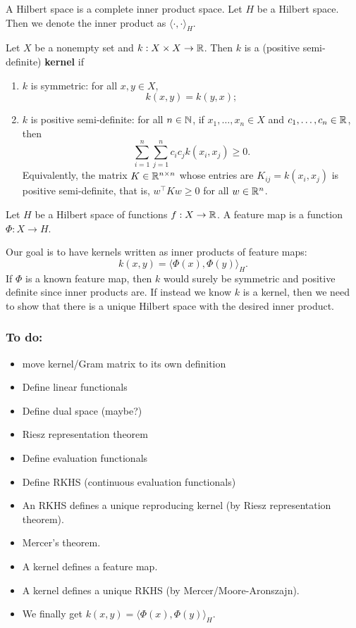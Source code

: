 \begin{definition}
    A Hilbert space is a complete inner product space.
    Let \(H\) be a Hilbert space.
    Then we denote the inner product as \(\langle \cdot, \cdot \rangle_H\).
\end{definition}

\begin{definition}[kernel]
    Let \(X\) be a nonempty set and \(k : X \times X \to \mathbb{R}\).
    Then \(k\) is a (positive semi-definite) \textbf{kernel} if
    \begin{enumerate}
        \item \(k\) is symmetric: for all \(x,y \in X\),
        \[k(x,y) = k(y,x);\]
        \item \(k\) is positive semi-definite: for all \(n \in \mathbb{N}\), if \(x_1, \dots, x_n \in X\) and \(c_1, \dots, c_n \in \mathbb{R}\), then
        \[\sum_{i=1}^{n}\sum_{j=1}^{n} c_i c_j k(x_i, x_j) \geq 0.\]
        Equivalently, the matrix \(K \in \mathbb{R}^{n \times n}\) whose entries are \(K_{ij} = k(x_i, x_j)\) is positive semi-definite, that is, \(w^\top K w \geq 0\) for all \(w \in \mathbb{R}^n\).
    \end{enumerate}
\end{definition}

\begin{definition}
    \cite{rudin2020notes}
    Let \(H\) be a Hilbert space of functions \(f : X \to \mathbb{R}\).
    A feature map is a function \(\Phi : X \to H\).
\end{definition}

Our goal is to have kernels written as inner products of feature maps:
\[k(x,y) = \langle \Phi(x), \Phi(y) \rangle_H.\]
If \(\Phi\) is a known feature map, then \(k\) would surely be symmetric and positive definite since inner products are.
If instead we know \(k\) is a kernel, then we need to show that there is a unique Hilbert space with the desired inner product.

\subsubsection*{To do:}
\begin{itemize}
    \item move kernel/Gram matrix to its own definition
    \item Define linear functionals
    \item Define dual space (maybe?)
    \item Riesz representation theorem
    \item Define evaluation functionals
    \item Define RKHS (continuous evaluation functionals)
    \item An RKHS defines a unique reproducing kernel (by Riesz representation theorem).
    \item Mercer's theorem.
    \item A kernel defines a feature map.
    \item A kernel defines a unique RKHS (by Mercer/Moore-Aronszajn).
    \item We finally get \(k(x,y) = \langle \Phi(x), \Phi(y) \rangle_H\).
\end{itemize}

